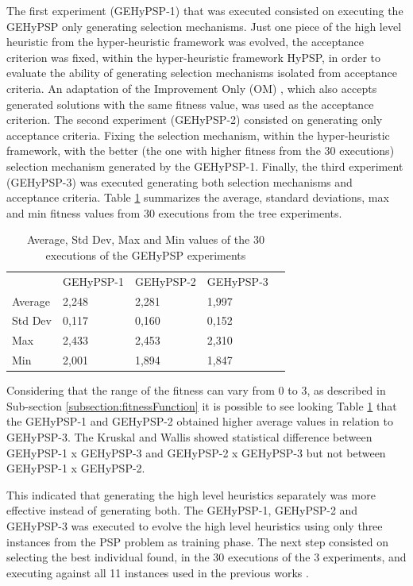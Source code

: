 \documentclass[conference]{IEEEtran}
\begin{document}
The first  experiment (GEHyPSP-1) that was executed consisted on executing the GEHyPSP only generating selection mechanisms. Just one piece of the high level heuristic from the hyper-heuristic framework was evolved, the acceptance criterion was fixed, within the hyper-heuristic framework HyPSP,  in order to evaluate the ability of generating selection mechanisms isolated from acceptance criteria. An adaptation of the Improvement Only (OM) \cite{burke2013hyper}, which also accepts generated solutions with the same fitness value, was used as the acceptance criterion. The second experiment (GEHyPSP-2) consisted on generating only acceptance criteria. Fixing the selection mechanism, within the hyper-heuristic framework, with the better (the one with higher fitness from the 30 executions) selection mechanism generated by the GEHyPSP-1. Finally, the third experiment (GEHyPSP-3) was executed generating both selection mechanisms and acceptance criteria. Table \ref{tab:geExps} summarizes the average, standard deviations, max and min fitness values from 30 executions from the tree experiments.


\begin{table}[]
	\centering
	\caption{Average, Std Dev, Max and Min values of the 30 executions of the GEHyPSP experiments}
	\label{tab:geExps}
	\begin{tabular}{lllll}
		& GEHyPSP-1 & GEHyPSP-2 & GEHyPSP-3 &  \\ \cline{1-4}
		Average & 2,248  & 2,281  & 1,997  &  \\ \cline{1-4}
		Std Dev & 0,117  & 0,160  & 0,152  &  \\ \cline{1-4}
		Max     & 2,433  & 2,453  & 2,310  &  \\ \cline{1-4}
		Min     & 2,001  & 1,894  & 1,847  & 
	\end{tabular}
\end{table}

Considering that the range of the fitness can vary from 0 to 3, as described in Sub-section \ref{subsection:fitnessFunction} it is possible to see looking Table \ref{tab:geExps} that the GEHyPSP-1 and GEHyPSP-2 obtained higher average values in relation to GEHyPSP-3. The Kruskal and Wallis showed statistical difference between GEHyPSP-1 x GEHyPSP-3  and GEHyPSP-2 x GEHyPSP-3 but not between GEHyPSP-1 x GEHyPSP-2.

This indicated that generating the high level heuristics separately was more effective instead of generating both. The GEHyPSP-1, GEHyPSP-2 and GEHyPSP-3 was executed to evolve the high level heuristics using only three instances from the PSP problem as training phase. The next step consisted on selecting the best individual found, in the 30 executions of the 3 experiments, and executing against all 11 instances used in the previous works \cite{custodio2004investigation,hsu2003growth,lin2011protein,unger1993genetic,santana2008protein,custodio2014multiple, garza2012locality} .
\end{document}
